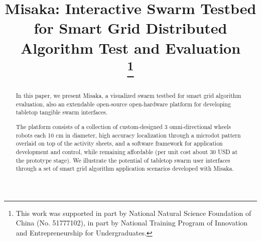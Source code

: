 \documentclass[conference]{IEEEtran}
\begin{document}
\title{Misaka: Interactive Swarm Testbed for Smart Grid Distributed Algorithm Test and Evaluation\\
\thanks{This work was supported in part by National Natural Science Foundation of China (No. 51777102), in part by National Training Program of Innovation and Entrepreneurship for Undergraduates.}
}

\author{
\and
{}
\and
{}
\and
{}
}

\maketitle

\begin{abstract}
    In this paper, we present Misaka, a visualized swarm testbed for smart grid algorithm evaluation, also an extendable open-source open-hardware platform for developing tabletop tangible swarm interfaces.

    The platform consists of a collection of custom-designed 3 omni-directional wheels robots each 10 cm in diameter, high accuracy localization through a microdot pattern overlaid on top of the activity sheets, and a software framework for application development and control, while remaining affordable (per unit cost about 30 USD at the prototype stage). We illustrate the potential of tabletop swarm user interfaces through a set of smart grid algorithm application scenarios developed with Misaka.
\end{abstract}
\end{document}
